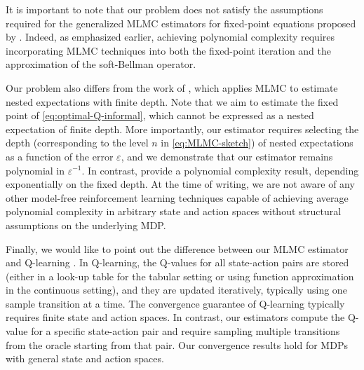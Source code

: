 \documentclass[11pt]{article}
\numberwithin{equation}{section}
\theoremstyle{definition}
\theoremstyle{remark}
\newcommand{\citep}{\cite}
\newcommand{\citet}{\cite}
\begin{document}
It is important to note that our problem does not satisfy the assumptions required for the generalized MLMC estimators for fixed-point equations proposed by \citet{giles2019generalisedmultilevelpicardapproximations}.
Indeed, as emphasized earlier, achieving polynomial complexity requires incorporating MLMC techniques into both the fixed-point iteration and the approximation of the soft-Bellman operator. 
 

Our problem also differs from the work of \citet{syed2023optimalrandomized}, which applies MLMC to estimate nested expectations with finite depth. Note that we aim to estimate the fixed point of \eqref{eq:optimal-Q-informal}, which cannot be expressed as a nested expectation of finite depth. More importantly, our estimator requires selecting the depth (corresponding to the level \(n\) in \eqref{eq:MLMC-sketch}) of nested expectations as a function of the error \(\varepsilon\), and we demonstrate that our estimator remains polynomial in \(\varepsilon^{-1}\). In contrast, \citet{syed2023optimalrandomized} provide a polynomial complexity result,  depending exponentially on the fixed depth. At the time of writing, we are not aware of any other model-free reinforcement learning techniques capable of achieving average polynomial complexity in arbitrary state and action spaces without structural assumptions on the underlying MDP.

 Finally, we would like to point out the difference between our MLMC estimator and Q-learning \citep{watkins1992q}. In Q-learning, the Q-values for all state-action pairs are stored (either in a look-up table for the tabular setting or using function approximation in the continuous setting), and they are updated iteratively, typically using one sample transition at a time. 
 The convergence guarantee of Q-learning typically requires finite state and action spaces. In contrast, our estimators compute the Q-value for a specific state-action pair and require sampling multiple transitions from the oracle starting from that pair.
 Our convergence results hold  for MDPs with general state and action spaces. 
\end{document}
